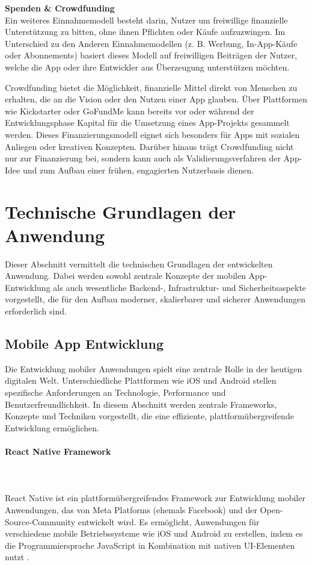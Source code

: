 \textbf{Spenden \& Crowdfunding}\\
Ein weiteres Einnahmemodell besteht darin, Nutzer um freiwillige finanzielle Unterstützung zu bitten, ohne ihnen Pflichten oder Käufe aufzuzwingen. Im Unterschied zu den Anderen Einnahmemodellen (z. B. Werbung, In-App-Käufe oder Abonnements) basiert dieses Modell auf freiwilligen Beiträgen der Nutzer, welche die App oder ihre Entwickler aus Überzeugung unterstützen möchten.

Crowdfunding bietet die Möglichkeit, finanzielle Mittel direkt von Menschen zu erhalten, die an die Vision oder den Nutzen einer App glauben. Über Plattformen wie Kickstarter oder GoFundMe kann bereits vor oder während der Entwicklungsphase Kapital für die Umsetzung eines App-Projekts gesammelt werden. Dieses Finanzierungsmodell eignet sich besonders für Apps mit sozialen Anliegen oder kreativen Konzepten. Darüber hinaus trägt Crowdfunding nicht nur zur Finanzierung bei, sondern kann auch als Validierungsverfahren der App-Idee und zum Aufbau einer frühen, engagierten Nutzerbasis dienen.\cite{Funding}


\section{Technische Grundlagen der Anwendung}
Dieser Abschnitt vermittelt die technischen Grundlagen der entwickelten Anwendung. Dabei werden sowohl zentrale Konzepte der mobilen App-Entwicklung als auch wesentliche Backend-, Infrastruktur- und Sicherheitsaspekte vorgestellt, die für den Aufbau moderner, skalierbarer und sicherer Anwendungen erforderlich sind.

\subsection{Mobile App Entwicklung}
Die Entwicklung mobiler Anwendungen spielt eine zentrale Rolle in der heutigen digitalen Welt. Unterschiedliche Plattformen wie iOS und Android stellen spezifische Anforderungen an Technologie, Performance und Benutzerfreundlichkeit. In diesem Abschnitt werden zentrale Frameworks, Konzepte und Techniken vorgestellt, die eine effiziente, plattformübergreifende Entwicklung ermöglichen.

\paragraph{React Native Framework}
\mbox{}\\
\mbox{}\\
React Native ist ein plattformübergreifendes Framework zur Entwicklung mobiler Anwendungen, das von Meta Platforms (ehemals Facebook) und der Open-Source-Community entwickelt wird. Es ermöglicht, Anwendungen für verschiedene mobile Betriebssysteme wie iOS und Android zu erstellen, indem es die Programmiersprache JavaScript in Kombination mit nativen UI-Elementen nutzt \cite{brainhub_react_native}.

